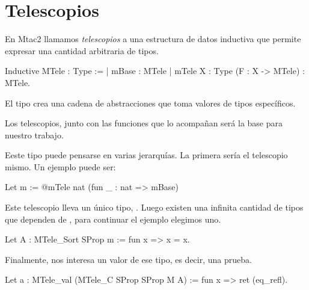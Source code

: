 \section{Telescopios}

En Mtac2 llamamos \textit{telescopios} a una estructura de datos inductiva
que permite expresar una cantidad arbitraria de tipos.

\begin{coqe}
Inductive MTele : Type :=
| mBase : MTele
| mTele {X : Type} (F : X -> MTele) : MTele.
\end{coqe}

El tipo  crea una cadena de abstracciones que toma valores de tipos específicos.

Los telescopios, junto con las funciones que lo acompañan será la base para nuestro
trabajo.

Eeste tipo puede pensarse en varias jerarquías.
La primera sería el telescopio mismo.
Un ejemplo puede ser:

\begin{coqe}
Let m := @mTele nat (fun _ : nat => mBase)
\end{coqe}

Este telescopio lleva un único tipo, .
Luego existen una infinita cantidad de tipos que dependen de , para
continuar el ejemplo elegimos uno.

\begin{coqe}
Let A : MTele_Sort SProp m := fun x => x = x.
\end{coqe}

Finalmente, nos interesa un valor de ese tipo, es decir, una prueba.

\begin{coqe}
Let a : MTele_val (MTele_C SProp SProp M A) := fun x => ret (eq_refl).
\end{coqe}
